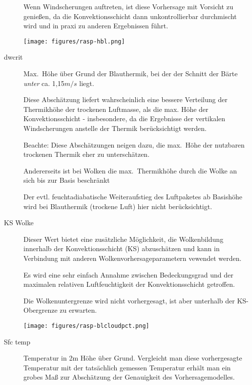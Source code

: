 \begin{description}
Wenn Windscherungen auftreten, ist diese Vorhersage mit Vorsicht zu genießen,
da die Konvektionsschicht dann unkontrollierbar durchmischt wird und in praxi zu
anderen Ergebnissen führt.

\begin{center}
\texttt{[image: figures/rasp-hbl.png]}
\end{center}

\item[dwcrit]
Max.\ Höhe über Grund der Blauthermik, bei der der Schnitt der Bärte  \textsl{unter} ca. 1,15$m/s$ liegt.

Diese Abschätzung liefert  wahrscheinlich eine bessere Verteilung der Thermikhöhe
der trockenen Luftmasse, als die max. Höhe der Konvektionsschicht - insbesondere, 
da die Ergebnisse der vertikalen Windscherungen anstelle der Thermik berücksichtigt
werden.


Beachte: Diese Abschätzungen neigen dazu, die max.\ Höhe der
nutzbaren trockenen Thermik eher zu unterschätzen.

Andererseits ist bei Wolken die max.\ Thermikhöhe durch  die Wolke an sich bis
zur Basis  beschränkt

Der evtl. feuchtadiabatische Weiteraufstieg des Luftpaketes ab Basishöhe wird bei
Blauthermik (trockene Luft) hier nicht berücksichtigt.

\item[KS Wolke]
Dieser Wert bietet eine zusätzliche Möglichkeit, die Wolkenbildung innerhalb der
Konvektionsschicht (KS) abzuschätzen und kann in Verbindung mit anderen
Wolkenvorhersageparametern vewendet werden.

Es wird eine sehr einfach Annahme zwischen Bedeckungsgrad und der maximalen
relativen Luftfeuchtigkeit der Konvektionsschicht getroffen.

Die Wolkenuntergrenze wird nicht vorhergesagt, ist aber unterhalb der
 KS-Obergrenze zu erwarten.


\begin{center}
\texttt{[image: figures/rasp-blcloudpct.png]}
\end{center}

\item[Sfc temp]

Temperatur in 2m Höhe über Grund.
Vergleicht man diese vorhergesagte Temperatur mit der tatsächlich gemessen Temperatur
erhält man ein grobes Maß  zur Abschätzung der Genauigkeit des Vorhersagemodelles.


\end{description}
